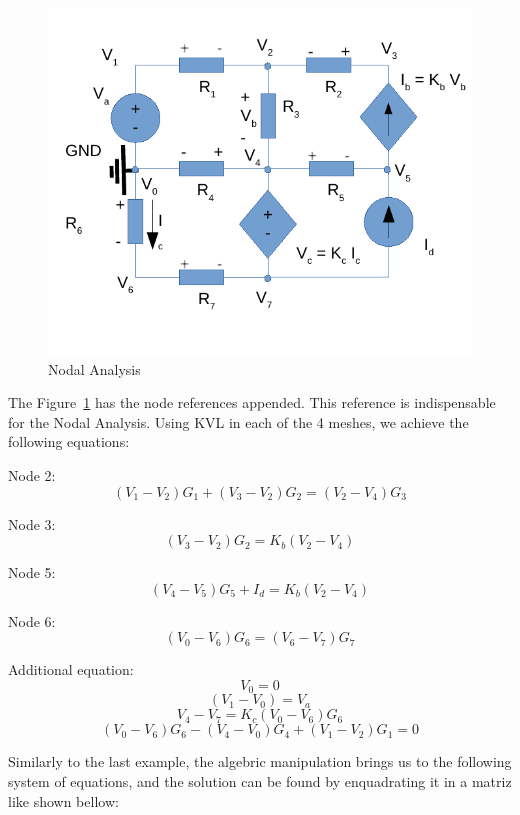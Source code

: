 \begin{figure}[h!] \centering
	\includegraphics[width=0.7\linewidth]{circ_node.pdf}
	\caption{Nodal Analysis}
	\label{fig:circuitNodes}
\end{figure}

\vspace{0.5cm}

The Figure~\ref{fig:circuitNodes} has the node references appended.
This reference is indispensable for the Nodal Analysis.
Using KVL in each of the 4 meshes, we achieve the following equations:

\vspace{0.5cm}

Node 2:
$$ (V_1 - V_2)G_1 + (V_3 - V_2)G_2 = (V_2 - V_4)G_3 $$

Node 3:
$$ (V_3 - V_2)G_2 = K_b(V_2 - V_4) $$

Node 5:
$$ (V_4 - V_5)G_5 + I_d = K_b(V_2 - V_4) $$

Node 6:
$$ (V_0 - V_6)G_6 = (V_6 - V_7)G_7 $$

Additional equation:
$$ V_0 = 0 $$
$$ (V_1 - V_0) = V_a $$
$$ V_4 - V_7 = K_c(V_0 - V_6)G_6$$
$$ (V_0 -V_6)G_6 - (V_4 - V_0)G_4 + (V_1 - V_2)G_1 = 0 $$

\vspace{0.5cm}

Similarly to the last example, the algebric manipulation brings us to the following system of equations, 
and the solution can be found by enquadrating it in a matriz like shown bellow:

